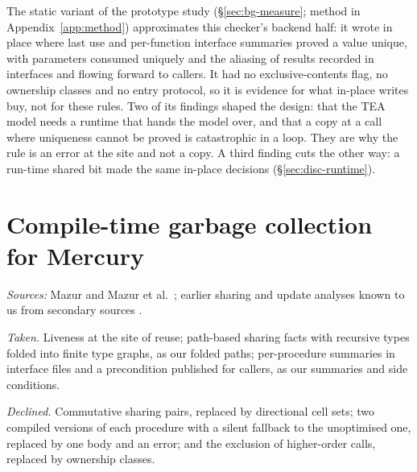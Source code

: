 The static variant of the prototype study (\S\ref{sec:bg-measure}; method in Appendix~\ref{app:method})
approximates this checker's backend half: it wrote in place where last use and per-function interface
summaries proved a value unique, with parameters consumed uniquely and the aliasing of results recorded in
interfaces and flowing forward to callers. It had no exclusive-contents flag, no ownership classes and no
entry protocol, so it is evidence for what in-place writes buy, not for these rules. Two of its findings
shaped the design: that the TEA model needs a runtime that hands the model over, and that a copy at a call
where uniqueness cannot be proved is catastrophic in a loop. They are why the rule is an error at the site
and not a copy. A third finding cuts the other way: a run-time shared bit made the same in-place decisions
(\S\ref{sec:disc-runtime}).

\section{Compile-time garbage collection for Mercury}

\emph{Sources:} Mazur \citep{mazur2004thesis} and Mazur et al.\ \citep{mazur2001practical}; earlier
sharing and update analyses known to us from secondary sources \citep{bloss1989update,hudak1986semantic,jones1989compile,baker1990unify}.

\emph{Taken.} Liveness at the site of reuse; path-based sharing facts with recursive types folded into
finite type graphs, as our folded paths; per-procedure summaries in interface files and a precondition
published for callers, as our summaries and side conditions.

\emph{Declined.} Commutative sharing pairs, replaced by directional cell sets; two compiled versions of
each procedure with a silent fallback to the unoptimised one, replaced by one body and an error; and the
exclusion of higher-order calls, replaced by ownership classes.
